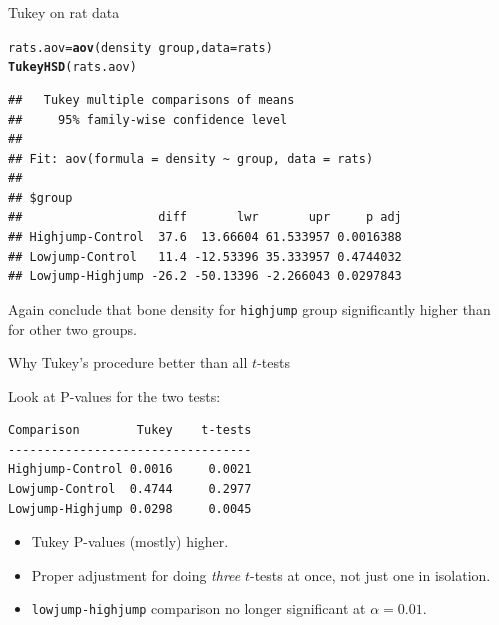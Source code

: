 \documentclass[unknownkeysallowed]{beamer}\usepackage[]{graphicx}\usepackage[]{color}
\makeatletter
\newcommand{\hlopt}[1]{\textcolor[rgb]{0,0,0}{#1}}%
\newcommand{\hlstd}[1]{\textcolor[rgb]{0.345,0.345,0.345}{#1}}%
\newcommand{\hlkwb}[1]{\textcolor[rgb]{0.69,0.353,0.396}{#1}}%
\newcommand{\hlkwc}[1]{\textcolor[rgb]{0.333,0.667,0.333}{#1}}%
\newcommand{\hlkwd}[1]{\textcolor[rgb]{0.737,0.353,0.396}{\textbf{#1}}}%
\newenvironment{kframe}{%
 \def\at@end@of@kframe{}%
 \ifinner\ifhmode%
  \def\at@end@of@kframe{\end{minipage}}%
  \begin{minipage}{\columnwidth}%
 \fi\fi%
 \def\FrameCommand##1{\hskip\@totalleftmargin \hskip-\fboxsep
 \colorbox{shadecolor}{##1}\hskip-\fboxsep
     \hskip-\linewidth \hskip-\@totalleftmargin \hskip\columnwidth}%
 \MakeFramed {\advance\hsize-\width
   \@totalleftmargin\z@ \linewidth\hsize
   \@setminipage}}%
 {\par\unskip\endMakeFramed%
 \at@end@of@kframe}
\newenvironment{knitrout}{}{} %
\makeatother
\begin{document}
\begin{frame}[fragile]{Tukey on rat data}


\begin{knitrout}
\color{fgcolor}\begin{kframe}
\begin{alltt}
\hlstd{rats.aov}\hlkwb{=}\hlkwd{aov}\hlstd{(density}\hlopt{~}\hlstd{group,}\hlkwc{data}\hlstd{=rats)}
\hlkwd{TukeyHSD}\hlstd{(rats.aov)}
\end{alltt}
\begin{verbatim}
##   Tukey multiple comparisons of means
##     95% family-wise confidence level
## 
## Fit: aov(formula = density ~ group, data = rats)
## 
## $group
##                   diff       lwr       upr     p adj
## Highjump-Control  37.6  13.66604 61.533957 0.0016388
## Lowjump-Control   11.4 -12.53396 35.333957 0.4744032
## Lowjump-Highjump -26.2 -50.13396 -2.266043 0.0297843
\end{verbatim}
\end{kframe}
\end{knitrout}

Again conclude that bone density for \texttt{highjump} group significantly
  higher than for other two groups.
  
\end{frame}



\begin{frame}[fragile]{Why Tukey's procedure better than all
    $t$-tests}

Look at P-values for the two tests:

\begin{verbatim}
Comparison        Tukey    t-tests
----------------------------------
Highjump-Control 0.0016     0.0021
Lowjump-Control  0.4744     0.2977
Lowjump-Highjump 0.0298     0.0045
\end{verbatim}

\begin{itemize}
\item Tukey P-values (mostly) higher.
\item Proper adjustment for doing \emph{three} $t$-tests at once, not
  just one in isolation.
\item \texttt{lowjump-highjump} comparison no longer significant at
  $\alpha=0.01$. 
\end{itemize}

  
\end{frame}
\end{document}
